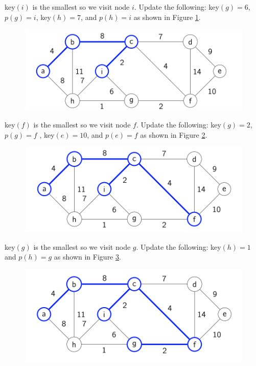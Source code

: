 \documentclass [12pt]{article}
\theoremstyle{definition}
\begin{document}
key$(i)$ is the smallest so we visit node $i$. Update the following: key$(g) = 6$, $p(g) = i$, key$(h)= 7$, and $p(h) = i$ as shown in Figure \ref{fig:prims_5}.

\begin{figure}[h!]
\centering
\includegraphics[scale=0.8]{prims_5.png}
\caption{}
\label{fig:prims_5}
\end{figure}

key$(f )$ is the smallest so we visit node $f$. Update the following: key$(g) = 2$, $p(g) = f$ , key$(e) = 10$, and $p(e) = f $ as shown in Figure \ref{fig:prims_6}.

\begin{figure}[h!]
\centering
\includegraphics[scale=0.8]{prims_6.png}
\caption{}
\label{fig:prims_6}
\end{figure}

key$(g)$ is the smallest so we visit node $g$. Update the following: key$(h) = 1$ and $p(h) = g$ as shown in Figure \ref{fig:prims_7}.

\begin{figure}[h!]
\centering
\includegraphics[scale=0.8]{prims_7.png}
\caption{}
\label{fig:prims_7}
\end{figure}
\end{document}
